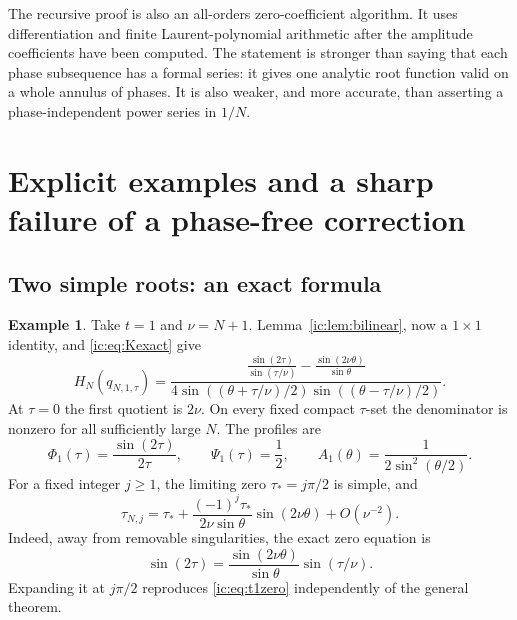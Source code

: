 \documentclass[11pt,a4paper]{article}
\numberwithin{equation}{section}
\theoremstyle{definition}
\newtheorem{example}[theorem]{Example}
\theoremstyle{remark}
\begin{document}
The recursive proof is also an all-orders zero-coefficient algorithm.
It uses differentiation and finite Laurent-polynomial arithmetic after
the amplitude coefficients have been computed. The statement is
stronger than saying that each phase subsequence has a formal series:
it gives one analytic root function valid on a whole annulus of phases.
It is also weaker, and more accurate, than asserting a phase-independent
power series in $1/N$.

\section{Explicit examples and a sharp failure of a phase-free correction}
\label{ic:sec:examples}
\subsection{Two simple roots: an exact formula}
\begin{example}\label{ic:ex:t1}
Take $t=1$ and $\nu=N+1$. Lemma~\ref{ic:lem:bilinear}, now a $1\times1$
identity, and \eqref{ic:eq:Kexact} give
\begin{equation}\label{ic:eq:t1exact}
 H_N(q_{N,1,\tau})=
 \frac{\displaystyle
     \frac{\sin(2\tau)}{\sin(\tau/\nu)}
       -\frac{\sin(2\nu\theta)}{\sin\theta}}
 {4\sin((\theta+\tau/\nu)/2)
       \sin((\theta-\tau/\nu)/2)}.
\end{equation}
At $\tau=0$ the first quotient is $2\nu$. On every fixed compact
$\tau$-set the denominator is nonzero for all sufficiently large $N$.
The profiles are
\begin{equation}\label{ic:eq:t1profiles}
 \Phi_1(\tau)=\frac{\sin(2\tau)}{2\tau},\qquad
 \Psi_1(\tau)=\frac12,\qquad
 A_1(\theta)=\frac1{2\sin^2(\theta/2)}.
\end{equation}
For a fixed integer $j\ge1$, the limiting zero
$\tau_*=j\pi/2$ is simple, and
\begin{equation}\label{ic:eq:t1zero}
 \tau_{N,j}=\tau_*+
 \frac{(-1)^j\tau_*}{2\nu\sin\theta}\sin(2\nu\theta)
 +O(\nu^{-2}).
\end{equation}
Indeed, away from removable singularities, the exact zero equation is
\begin{equation}\label{ic:eq:t1zeroeq}
 \sin(2\tau)=\frac{\sin(2\nu\theta)}{\sin\theta}
                  \sin(\tau/\nu).
\end{equation}
Expanding it at $j\pi/2$ reproduces \eqref{ic:eq:t1zero} independently of
the general theorem.
\end{example}
\end{document}
